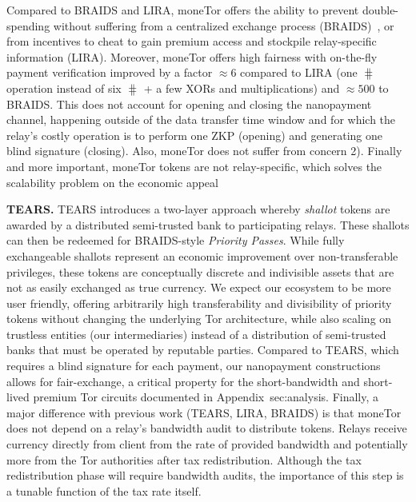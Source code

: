Compared to BRAIDS and LIRA, moneTor offers the ability to prevent double-spending without suffering from a centralized exchange process (BRAIDS)~\cite{jansenblogpost}, or from incentives to cheat to gain premium access and stockpile relay-specific information (LIRA).
Moreover, moneTor offers high fairness with on-the-fly payment verification improved by a factor $\approx 6$ compared to LIRA (one $\hash$ operation instead of six $\hash$ + a few XORs and multiplications) and $\approx 500$ to BRAIDS.
This does not account for opening and closing the nanopayment channel, happening outside of the data transfer time window and for which the relay's costly operation is to perform one ZKP (opening) and generating one blind signature (closing).
Also, moneTor does not suffer from concern 2).
Finally and more important, moneTor tokens are not relay-specific, which solves the scalability problem on the economic appeal

\medskip\noindent\textbf{TEARS.}
TEARS introduces a two-layer approach whereby \emph{shallot} tokens are awarded by a distributed semi-trusted bank to participating relays.
These shallots can then be redeemed for BRAIDS-style \emph{Priority Passes}.
While fully exchangeable shallots represent an economic improvement over non-transferable privileges, these tokens are conceptually discrete and indivisible assets that are not as easily exchanged as true currency.
We expect our ecosystem to be more user friendly, offering arbitrarily high transferability and divisibility of priority tokens without changing the underlying Tor architecture, while also scaling on trustless entities (our intermediaries) instead of a distribution of semi-trusted banks that must be operated by reputable parties.
Compared to TEARS, which requires a blind signature for each payment, our nanopayment constructions allows for fair-exchange, a critical property for the short-bandwidth and short-lived premium Tor circuits documented in Appendix~{sec:analysis}.
Finally, a major difference with previous work (TEARS, LIRA, BRAIDS) is that moneTor does not depend on a relay's bandwidth audit to distribute tokens.
Relays receive currency directly from client from the rate of provided bandwidth and potentially more from the Tor authorities after tax redistribution.
Although the tax redistribution phase will require bandwidth audits, the importance of this step is a tunable function of the tax rate itself.

